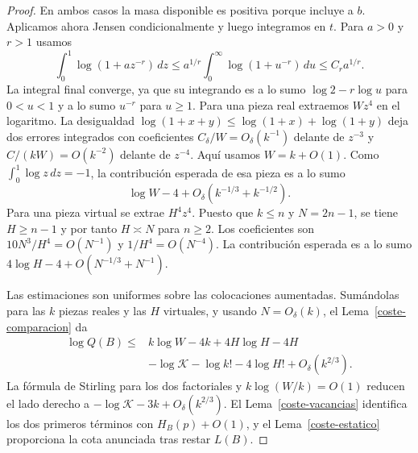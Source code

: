 \begin{proof}
En ambos casos la masa disponible es positiva porque incluye a $b$. Aplicamos ahora Jensen
condicionalmente y luego integramos en $t$. Para $a>0$ y $r>1$ usamos
\[
 \int_0^1\log(1+a z^{-r})\,dz
 \le a^{1/r}\int_0^\infty\log(1+u^{-r})\,du
 \le C_r a^{1/r}.
\]
La integral final converge, ya que su integrando es a lo sumo $\log 2-r\log u$ para $0<u<1$ y a lo
sumo $u^{-r}$ para $u\ge1$. Para una pieza real extraemos $Wz^4$ en el logaritmo. La desigualdad
$\log(1+x+y)\le\log(1+x)+\log(1+y)$ deja dos errores integrados con coeficientes
$C_\delta/W=O_\delta(k^{-1})$ delante de $z^{-3}$ y $C/(kW)=O(k^{-2})$ delante de $z^{-4}$. Aquí
usamos $W=k+O(1)$. Como $\int_0^1\log z\,dz=-1$, la contribución esperada de esa pieza es a lo sumo
\[
 \log W-4+O_\delta(k^{-1/3}+k^{-1/2}).
\]
Para una pieza virtual se extrae $H^4z^4$. Puesto que $k\le n$ y $N=2n-1$, se tiene $H\ge n-1$ y por
tanto $H\asymp N$ para $n\ge2$. Los coeficientes son $10N^3/H^4=O(N^{-1})$ y $1/H^4=O(N^{-4})$. La
contribución esperada es a lo sumo $4\log H-4+O(N^{-1/3}+N^{-1})$.

Las estimaciones son uniformes sobre las colocaciones aumentadas. Sumándolas para las $k$ piezas
reales y las $H$ virtuales, y usando $N=O_\delta(k)$, el Lema~\ref{coste-comparacion} da
\[
 \begin{split}
 \log Q(B)\le {}&
 k\log W-4k+4H\log H-4H\\
 &-\log\mathcal K-\log k!-4\log H!+O_\delta(k^{2/3}).
 \end{split}
\]
La fórmula de Stirling para los dos factoriales y $k\log(W/k)=O(1)$ reducen el lado derecho a
$-\log\mathcal K-3k+O_\delta(k^{2/3})$. El Lema~\ref{coste-vacancias} identifica los dos primeros
términos con $H_B(p)+O(1)$, y el Lema~\ref{coste-estatico} proporciona la cota anunciada tras restar
$L(B)$.
\end{proof}
